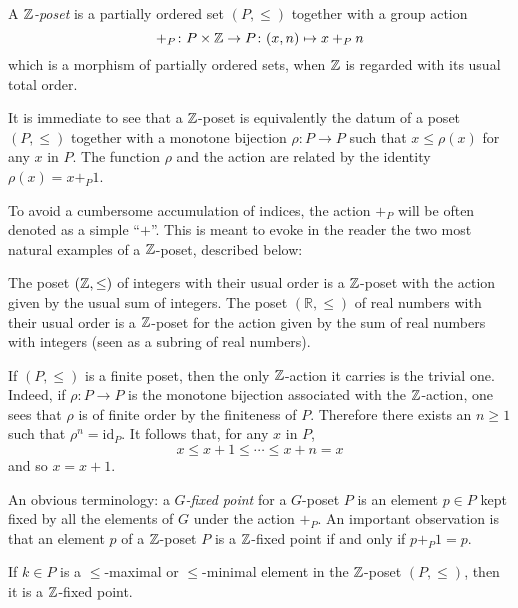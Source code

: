 \begin{definition}\label{zposet}
A \emph{$\mathbb{Z} $\hyp{}poset} is a partially ordered set $(P,\leq)$ together with a group action 
\[
+_P\colon P\times \mathbb{Z} \to P \colon (x,n) \mapsto x+_Pn 
\]
 which is a morphism of partially ordered sets, when $\mathbb{Z} $ is regarded with its usual total order.
\end{definition}
\begin{remark}\label{trivial.but.useful}
It is immediate to see that a $\mathbb{Z} $\hyp{}poset is equivalently the datum of a poset $(P,\leq)$ together with a monotone bijection $\rho\colon P\to P$ such that $x\leq \rho(x)$ for any $x$ in $P$. The function $\rho$ and the action are related by the identity $\rho(x)=x+_P1$.
\end{remark}
\begin{notat}
To avoid a cumbersome accumulation of indices, the action $+_P$ will be often denoted as a simple ``$+$''. This is meant to evoke in the reader the two most natural examples of a $\mathbb{Z} $\hyp{}poset, described below:
\end{notat}
\begin{example}The poset $(\mathbb{Z} ,\leq)$ of integers with their usual order is a $\mathbb{Z} $\hyp{}poset with the action given by the usual sum of integers. The poset $(\mathbb{R},\leq)$ of real numbers with their usual order is a $\mathbb{Z} $\hyp{}poset for the action given by the sum of real numbers with integers (seen as a subring of real numbers).
\end{example}
\marginnote{\textdbend}
\begin{remark}\label{rem.finite}
 If $(P,\leq)$ is a finite poset, then the only $\mathbb{Z} $\hyp{}action it carries is the trivial one. Indeed, if $\rho\colon P\to P$ is the monotone bijection associated with the $\mathbb{Z} $\hyp{}action, one sees that $\rho$ is of finite order by the finiteness of $P$. Therefore there exists an $n\geq 1$ such that $\rho^n=\mathrm{id}_P$. It follows that, for any $x$ in $P$,
 \[
 x\leq x+1\leq\cdots\leq x+n=x
 \]
and so $x=x+1$.
\end{remark}
\begin{notat}
An obvious terminology: a \emph{$G$\hyp{}fixed point} for a $G$\hyp{}poset $P$ is an element $p\in P$ kept fixed by all the elements of $G$ under the action $+_P$. An important observation is that an element $p$ of a $\mathbb{Z}$\hyp{}poset $P$ is a $\mathbb{Z}$\hyp{}fixed point if and only if $p+_P 1 = p$.
\end{notat}
\begin{lemma}\label{minmax}
 If $k\in P$ is a $\le$\hyp{}maximal or $\le$\hyp{}minimal element in the $\mathbb{Z} $\hyp{}poset $(P,\leq)$, then it is a $\mathbb{Z} $\hyp{}fixed point.
\end{lemma}
